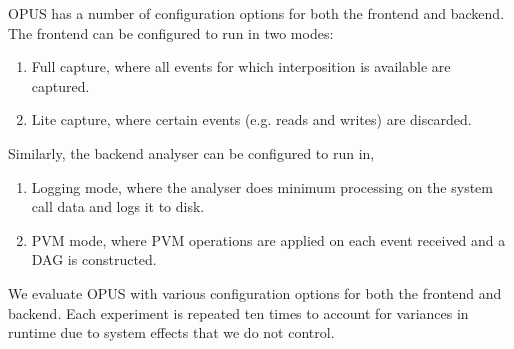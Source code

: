 \documentclass[withindex,glossary]{cam-thesis}
\begin{document}
OPUS has a number of configuration options for both the frontend and backend.
The frontend can be configured to run in two modes:
\begin{enumerate}
\item Full capture, where all events for which interposition is available are captured.
\item Lite capture, where certain events (e.g. reads and writes) are discarded.
\end{enumerate}

Similarly, the backend analyser can be configured to run in,
\begin{enumerate}
\item Logging mode, where the analyser does minimum processing on the system call data and logs it to disk.
\item PVM mode, where PVM operations are applied on each event received and a DAG is constructed.
\end{enumerate}

We evaluate OPUS with various configuration options for both the frontend and backend.
Each experiment is repeated ten times to account for variances in runtime due to system effects that we do not control.

% 



\end{document}
